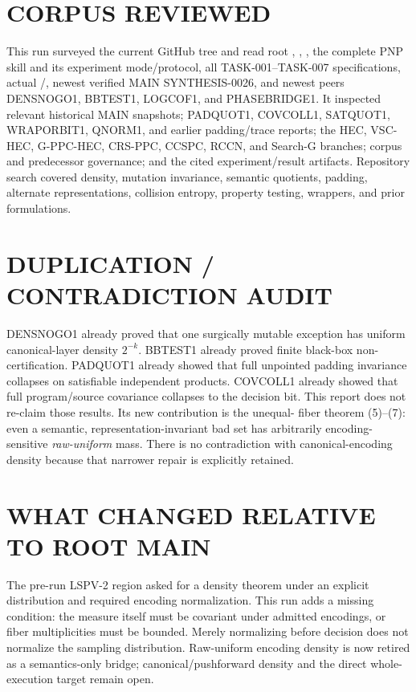 \documentclass[11pt]{article}
\begin{document}
\section{CORPUS REVIEWED}
This run surveyed the current GitHub tree and read root ,
, , the complete PNP skill and its experiment
mode/protocol, all TASK-001--TASK-007 specifications, actual
/, newest verified MAIN SYNTHESIS-0026, and
newest peers DENSNOGO1, BBTEST1, LOGCOF1, and PHASEBRIDGE1. It inspected
relevant historical MAIN snapshots; PADQUOT1, COVCOLL1, SATQUOT1, WRAPORBIT1,
QNORM1, and earlier padding/trace reports; the HEC, VSC-HEC, G-PPC-HEC,
CRS-PPC, CCSPC, RCCN, and Search-G branches; corpus and predecessor governance;
and the cited experiment/result artifacts. Repository search covered density,
mutation invariance, semantic quotients, padding, alternate representations,
collision entropy, property testing, wrappers, and prior formulations.

\section{DUPLICATION / CONTRADICTION AUDIT}
DENSNOGO1 already proved that one surgically mutable exception has uniform
canonical-layer density \(2^{-k}\). BBTEST1 already proved finite black-box
non-certification. PADQUOT1 already showed that full unpointed padding
invariance collapses on satisfiable independent products. COVCOLL1 already
showed that full program/source covariance collapses to the decision bit. This
report does not re-claim those results. Its new contribution is the unequal-
fiber theorem (5)--(7): even a semantic, representation-invariant bad set has
arbitrarily encoding-sensitive \emph{raw-uniform} mass. There is no
contradiction with canonical-encoding density because that narrower repair is
explicitly retained.

\section{WHAT CHANGED RELATIVE TO ROOT MAIN}
The pre-run LSPV-2 region asked for a density theorem under an explicit
distribution and required encoding normalization. This run adds a missing
condition: the measure itself must be covariant under admitted encodings, or
fiber multiplicities must be bounded. Merely normalizing before decision does
not normalize the sampling distribution. Raw-uniform encoding density is now
retired as a semantics-only bridge; canonical/pushforward density and the
direct whole-execution target remain open.
\end{document}
